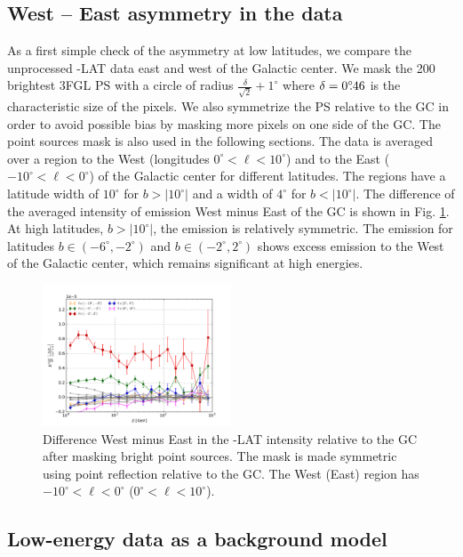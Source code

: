 \subsection{West -- East asymmetry in the data}
\label{sec:data_diff}

As a first simple check of the asymmetry at low latitudes, we compare the unprocessed \Fermi-LAT data east and west of the Galactic center. 
We mask the 200 brightest 3FGL PS  with a circle of radius $\frac{\delta}{\sqrt{2}} + 1^\circ$ where $\delta = 0^\circ\!\!.46$ is the characteristic size of the pixels. We also symmetrize the PS relative to the GC in order to avoid possible bias by masking more pixels on one side of the GC. The point sources mask is also used in the following sections. 
The data is averaged over a region to the West (longitudes $0^\circ < \ell < 10^\circ$) and to the East ($-10^\circ < \ell  <  0^\circ$) of the Galactic center for different latitudes. The regions have a latitude width of $10^\circ$ for $b >|10^\circ|$ and a width of  $4^\circ$ for  $b <|10^\circ|$. 
The difference of the averaged intensity of emission West minus East of the GC is shown in Fig. \ref{fig:data_diff}. At high latitudes, $b >|10^\circ|$, the emission is relatively symmetric. 
The emission for latitudes $b \in (-6^\circ, -2^\circ)$ and $b \in (-2^\circ, 2^\circ)$ shows excess emission to the West of the Galactic center, 
which remains significant at high energies. 


\begin{figure}[h]
 \includegraphics[width=0.5\textwidth]{plots/Difference_data_for_different_latitudes.pdf}
 \caption{Difference West minus East in the \Fermi-LAT intensity relative to the GC after masking bright point sources.
 The mask is made symmetric using point reflection relative to the GC.
 The West (East) region has $-10^\circ < \ell <0^\circ$ ($0^\circ < \ell <10^\circ$). }
 \label{fig:data_diff}
\end{figure}

\subsection{Low-energy data as a background model}
\label{sec:le_data_model}

